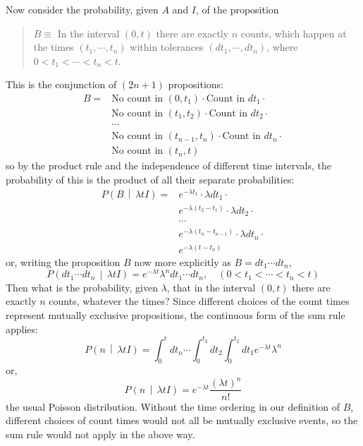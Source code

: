 \documentclass[12pt]{article}
\newcommand{\given}{\, \middle| \,}
\newcommand{\Prob}[2]{P\left(#1 \given #2 \right)}
\begin{document}
Now consider the probability, given $A$ and $I$, of the proposition
\begin{quote}
$B \equiv$ In the interval $(0, t)$ there are exactly $n$ counts, which happen at the times
$(t_1,\cdots,t_n)$ within tolerances $(dt_1,\cdots,dt_n)$, where $0 < t_1 < \cdots < t_n < t$.
\end{quote}
This is the conjunction of $(2n + 1)$ propositions:
\begin{equation}
\begin{split}
B ={}&\text{No count in $(0, t_1)$} \cdot \text{Count in $dt_1$} \cdot\\
     &\text{No count in $(t_1, t_2)$} \cdot \text{Count in $dt_2$} \cdot\\
     &\cdots\\
     &\text{No count in $(t_{n-1}, t_n)$} \cdot \text{Count in $dt_n$} \cdot\\
     &\text{No count in $(t_n, t)$}
\end{split}
\end{equation}
so by the product rule and the independence of different time intervals, the probability of this is
the product of all their separate probabilities:
\begin{equation}
\begin{split}
\Prob{B}{\lambda t I} ={}&e^{-\lambda t_1} \cdot \lambda dt_1 \cdot\\
                          &e^{-\lambda (t_2 - t_1)} \cdot \lambda dt_2\cdot\\
                          &\cdots\\
                          &e^{-\lambda (t_n - t_{n-1})}  \cdot \lambda dt_n \cdot\\
                          &e^{-\lambda (t - t_n)}
\end{split}
\end{equation}
or, writing the proposition $B$ now more explicitly as $B = dt_1 \cdots dt_n$,
\begin{equation}
\Prob{dt_1 \cdots dt_n}{\lambda t I} = e^{-\lambda t} \lambda^n dt_1 \cdots dt_n, \quad (0 < t_1 < \cdots < t_n < t)
\end{equation}
Then what is the probability, given $\lambda$, that in the interval $(0, t)$ there are exactly $n$ counts, whatever
the times? Since different choices of the count times represent mutually exclusive propositions, the
continuous form of the sum rule applies:
\begin{equation}
\Prob{n}{\lambda t I} = \int_0^t dt_n \cdots \int_0^{t_3} dt_2 \int_0^{t_2} dt_1 e^{-\lambda t} \lambda^n
\end{equation}
or,
\begin{equation}\label{eq:six}
\Prob{n}{\lambda t I} = e^{-\lambda t} \frac{(\lambda t)^n}{n!}
\end{equation}
the usual Poisson distribution. Without the time ordering in our definition of $B$, different choices
of count times would not all be mutually exclusive events, so the sum rule would not apply in the
above way.
\end{document}
